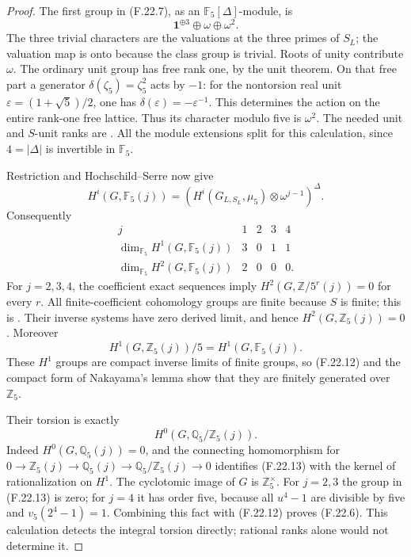 \begin{proof}
The first group in (F.22.7), as an \(\mathbb F_5[\Delta]\)-module,
is
\[
                  \mathbf1^{\oplus3}\oplus\omega\oplus\omega^2.
                                                               \tag{F.22.9}
\]
The three trivial characters are the valuations at the
three primes of \(S_L\); the valuation map is onto because
the class group is trivial. Roots of unity contribute
\(\omega\). The ordinary unit group has free rank one,
by the unit theorem. On that free part a generator
\(\delta(\zeta_5)=\zeta_5^2\) acts by \(-1\):
for the nontorsion real unit
\(\varepsilon=(1+\sqrt5)/2\), one has
\(\delta(\varepsilon)=-\varepsilon^{-1}\).
This determines the action on the entire rank-one free
lattice. Thus its character modulo five is \(\omega^2\).
The needed unit and \(S\)-unit ranks are
\citet[Theorems~5.1 and~5.11]{FA_Milne2020ANT}.
All the module extensions split for this calculation,
since \(4=|\Delta|\) is invertible in \(\mathbb F_5\).

Restriction and Hochschild--Serre now give
\[
 H^i(G,\mathbb F_5(j))
  =\left(H^i(G_{L,S_L},\mu_5)\otimes\omega^{j-1}\right)^\Delta.
                                                               \tag{F.22.10}
\]
Consequently
\[
 \begin{array}{c|rrrr}
 j&1&2&3&4\\ \hline
 \dim_{\mathbb F_5}H^1(G,\mathbb F_5(j))&3&0&1&1\\
 \dim_{\mathbb F_5}H^2(G,\mathbb F_5(j))&2&0&0&0 .
 \end{array}                                                    \tag{F.22.11}
\]
For \(j=2,3,4\), the coefficient exact sequences imply
\(H^2(G,\mathbb Z/5^r(j))=0\) for every \(r\).
All finite-coefficient cohomology groups are finite because
\(S\) is finite; this is
\citet[I, Corollary~4.15]{FA_Milne2006ADT}.
Their inverse systems have zero derived limit, and hence
\(H^2(G,\mathbb Z_5(j))=0\). Moreover
\[
 H^1(G,\mathbb Z_5(j))/5
                =H^1(G,\mathbb F_5(j)).                       \tag{F.22.12}
\]
These \(H^1\) groups are compact inverse limits of finite
groups, so (F.22.12) and the compact form of Nakayama's
lemma show that they are finitely generated over \(\mathbb Z_5\).

Their torsion is exactly
\[
          H^0(G,\mathbb Q_5/\mathbb Z_5(j)).
                                                               \tag{F.22.13}
\]
Indeed \(H^0(G,\mathbb Q_5(j))=0\), and the connecting
homomorphism for
\(0\to\mathbb Z_5(j)\to\mathbb Q_5(j)\to
\mathbb Q_5/\mathbb Z_5(j)\to0\) identifies (F.22.13)
with the kernel of rationalization on \(H^1\).
The cyclotomic image of \(G\) is \(\mathbb Z_5^\times\).
For \(j=2,3\) the group in (F.22.13) is zero; for \(j=4\)
it has order five, because all \(u^4-1\) are divisible
by five and \(v_5(2^4-1)=1\).
Combining this fact with (F.22.12) proves (F.22.6).
This calculation detects the integral torsion directly;
rational ranks alone would not determine it.


\end{proof}

